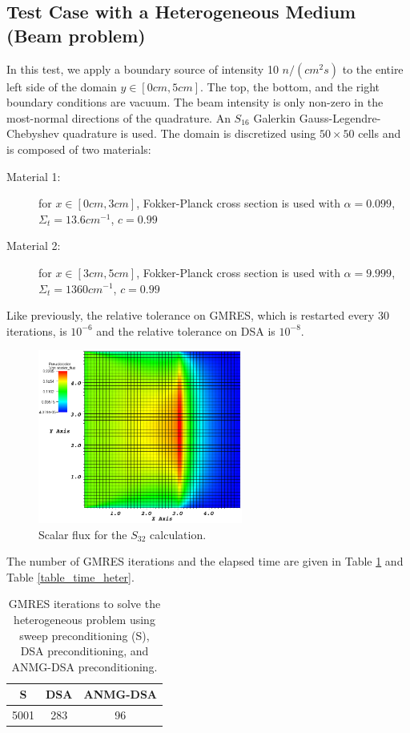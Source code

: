 \subsection{Test Case with a Heterogeneous Medium (Beam problem)}
In this test, we apply a boundary source of intensity 10 $n/(cm^2 s)$ to the
entire left side of the domain $y \in [0cm,5cm]$. The top, the bottom, 
and the right boundary conditions are vacuum. The beam intensity is only 
non-zero in the most-normal directions of the quadrature. An $S_{16}$ Galerkin 
Gauss-Legendre-Chebyshev quadrature is used. The domain
is discretized using $50 \times 50$ cells and is composed of two materials:
\begin{description}
  \item[Material 1:] for $x\in [0cm,3cm]$, Fokker-Planck cross section is used with 
    $\alpha=0.099$, $\Sigma_t = 13.6 cm^{-1}$, $c=0.99$
  \item[Material 2:] for $x\in [3cm,5cm]$, Fokker-Planck cross section is used with 
    $\alpha=9.999$, $\Sigma_t = 1360 cm^{-1}$, $c=0.99$
\end{description}
Like previously, the relative tolerance on GMRES, which is restarted every 30
iterations, is $10^{-6}$ and the relative tolerance on DSA is $10^{-8}$. 
\begin{figure}[H]
  \centering
  \includegraphics[width=0.6\textwidth]{Anmg/heterog_anmg_crop}
  \caption{Scalar flux for the $S_{32}$ calculation.}
\end{figure}
The number of GMRES iterations and the elapsed 
time are given in Table \ref{table_gmres_heter} and Table \ref{table_time_heter}.
\begin{table}[H]
  \begin{center}
    \caption{GMRES iterations to solve the heterogeneous problem using sweep
    preconditioning (S), DSA preconditioning, and ANMG-DSA preconditioning.}
    \begin{tabular}{|c|c|c|}
      \hline
      S & DSA & ANMG-DSA \\
      \hline
      5001 & 283 & 96 \\
      \hline
    \end{tabular}
    \label{table_gmres_heter}
  \end{center}
\end{table}
